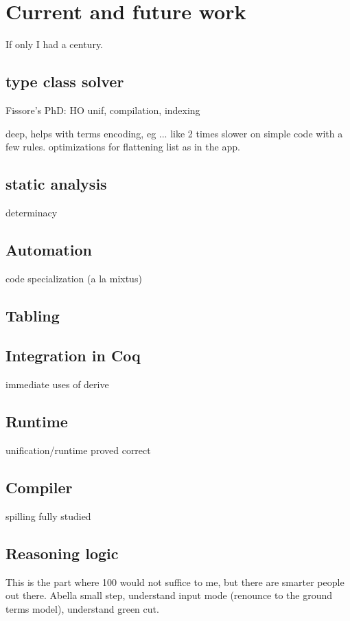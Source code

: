 \documentclass[a4paper, 11pt]{book}
\begin{document}
\section{Current and future work}

If only I had a century.

\subsection{type class solver}

Fissore's PhD: HO unif, compilation, indexing

deep, helps with terms encoding, eg ...
like 2 times slower on simple code with a few rules.
optimizations for flattening list as in the app.


\subsection{static analysis}

determinacy

\subsection{Automation}

code specialization (a la mixtus)

\subsection{Tabling}

\cite{selsam2020tabledtypeclassresolution}

\subsection{Integration in Coq}

immediate uses of derive

\subsection{Runtime}

unification/runtime proved correct

\subsection{Compiler}

spilling fully studied

\subsection{Reasoning logic}

This is the part where 100 would not suffice to me, but there are smarter people out there.
Abella small step, understand input mode (renounce to the ground terms model),
understand green cut.




\nocite{*}
\printbibliography[title={Our Bibliography}, keyword=me]
\printbibliography[title={Bibliography}, keyword=they]
\end{document}
